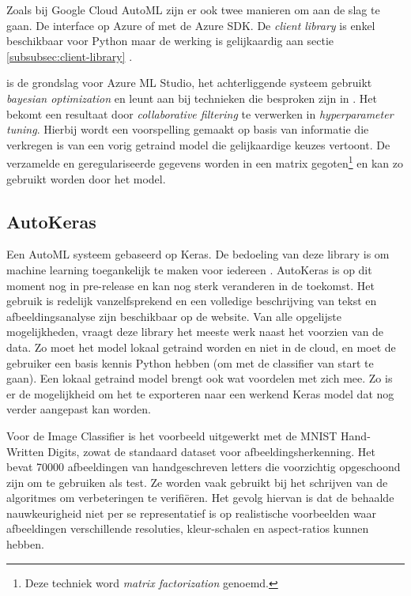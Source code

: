Zoals bij Google Cloud AutoML zijn er ook twee manieren om aan de slag te gaan. De interface op Azure of met de Azure SDK. De \textit{client library} is enkel beschikbaar voor Python maar de werking is gelijkaardig aan sectie \ref{subsubsec:client-library} \autocite{Microsoft2020}.

\textcite{fusi2017} is de grondslag voor Azure ML Studio, het achterliggende systeem gebruikt \textit{bayesian optimization} en leunt aan bij technieken die besproken zijn in \textcite{Feurer2015}. Het bekomt een resultaat door \textit{collaborative filtering} te verwerken in \textit{hyperparameter tuning}. Hierbij wordt een voorspelling gemaakt op basis van informatie die verkregen is van een vorig getraind model die gelijkaardige keuzes vertoont. De verzamelde en geregulariseerde gegevens worden in een matrix gegoten\footnote{Deze techniek word \textit{matrix factorization} genoemd.} en kan zo gebruikt worden door het model.

\subsection{AutoKeras}
\label{subsec:autokeras}

Een AutoML systeem gebaseerd op Keras. De bedoeling van deze library is om machine learning toegankelijk te maken voor iedereen \autocite{jin2019}. AutoKeras is op dit moment nog in pre-release en kan nog sterk veranderen in de toekomst. Het gebruik is redelijk vanzelfsprekend en een volledige beschrijving van tekst en afbeeldingsanalyse zijn beschikbaar op de website. Van alle opgelijste mogelijkheden, vraagt deze library het meeste werk naast het voorzien van de data. Zo moet het model lokaal getraind worden en niet in de cloud, en moet de gebruiker een basis kennis Python hebben (om met de classifier van start te gaan). Een lokaal getraind model brengt ook wat voordelen met zich mee. Zo is er de mogelijkheid om het te exporteren naar een werkend Keras model dat nog verder aangepast kan worden. 

Voor de Image Classifier is het voorbeeld uitgewerkt met de MNIST Hand-Written Digits, zowat de standaard dataset voor afbeeldingsherkenning. Het bevat 70000 afbeeldingen van handgeschreven letters die voorzichtig opgeschoond zijn om te gebruiken als test. Ze worden vaak gebruikt bij het schrijven van de algoritmes om verbeteringen te verifiëren. Het gevolg hiervan is dat de behaalde nauwkeurigheid niet per se representatief is op realistische voorbeelden waar afbeeldingen verschillende resoluties, kleur-schalen en aspect-ratios kunnen hebben.

